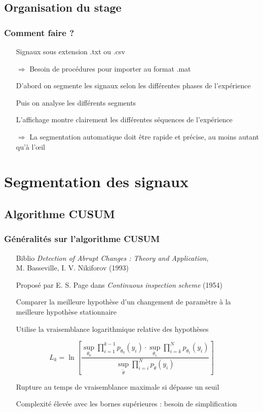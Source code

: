 \documentclass{beamer}
\begin{document}
\subsection{Organisation du stage}

\begin{frame}
	\frametitle{Comment faire ?}
	\begin{itemize}
		\item[Signaux] sous extension .txt ou .csv
		\item[$\Longrightarrow$] Besoin de procédures pour importer au format .mat
		\vspace*{0.5cm}
		\item[D'abord] on segmente les signaux selon les différentes phases de l'expérience
		\item[Puis] on analyse les différents segments
		\vspace*{0.5cm}
		\item[L'affichage] montre clairement les différentes séquences de l'expérience
		\item[$\Longrightarrow$] La segmentation automatique doit être rapide et précise, au moins autant qu'à l'œil
	\end{itemize}
\end{frame}

\section{Segmentation des signaux}


\subsection{Algorithme CUSUM}

\begin{frame}
	\frametitle{Généralités sur l'algorithme CUSUM}
	\begin{itemize}
		\item[Biblio] \emph{Detection of Abrupt Changes : Theory and Application},\\
		M. Basseville, I. V. Nikiforov (1993)
		\item[Proposé] par E. S. Page dans \emph{Continuous inspection scheme} (1954)
		\item[Comparer] la meilleure hypothèse d'un changement de paramètre à la meilleure hypothèse stationnaire
		\item[Utilise] la vraisemblance logarithmique relative des hypothèses
	\end{itemize}
	\begin{equation}
		L _k =\ln \left[ \frac{\sup_{\theta_0}\prod_{i=1}^{k-1} p_{\theta_0}(y_i)\cdot\sup_{\theta_1}\prod_{i = k}^{N}p_{\theta_1}(y_i)}{\sup_{\tilde\theta}\prod_{i=i}^{N}p_{\tilde{\theta}}(y_i)} \right]
	\end{equation}
	\begin{itemize}
		\item[Rupture] au temps de vraisemblance maximale si dépasse un seuil
		\item[Complexité] élevée avec les bornes supérieures : besoin de simplification
	\end{itemize}
\end{frame}
\end{document}
